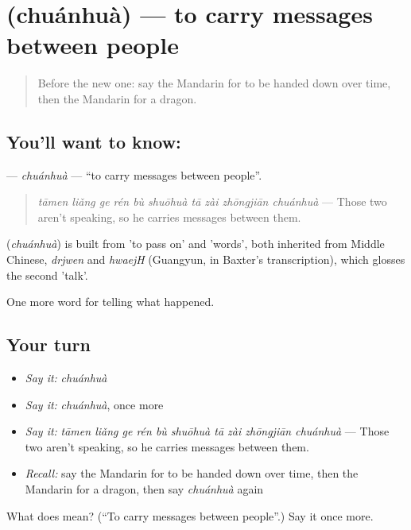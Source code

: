 \section[\texorpdfstring{\zh{传话} (chuánhuà)}{传话 (chuánhuà)}]{ (chuánhuà) — to carry messages between people}

\label{lesson:ZH-C328-chuanhua}



\begin{quote}
Before the new one: say the Mandarin for to be handed down over time, then the Mandarin for a dragon.
\end{quote}

\subsection*{You'll want to know: }
\textbf{} — \emph{chuánhuà} — \textquotedblleft{}to carry messages between people\textquotedblright{}.

\begin{quote}
\textbf{} \emph{tāmen liǎng ge rén bù shuōhuà tā zài zhōngjiān chuánhuà} — Those two aren't speaking, so he carries messages between them.
\end{quote}

\begin{cousinweb}
\textbf{} (\emph{chuánhuà}) is built from  'to pass on' and  'words', both inherited from Middle Chinese, \emph{drjwen} and \emph{hwaejH} (Guangyun, in Baxter's transcription), which glosses the second 'talk'.
\end{cousinweb}

\begin{grammarlens}[title={What you've built}]
One more word for telling what happened.
\end{grammarlens}

\subsection*{Your turn}
\begin{itemize}
\raggedright
  \item \emph{Say it:} \emph{chuánhuà}
  \item \emph{Say it:} \emph{chuánhuà}, once more
  \item \emph{Say it:} \emph{tāmen liǎng ge rén bù shuōhuà tā zài zhōngjiān chuánhuà} — Those two aren't speaking, so he carries messages between them.
  \item \emph{Recall:} say the Mandarin for to be handed down over time, then the Mandarin for a dragon, then say \emph{chuánhuà} again
\end{itemize}

\begin{tcolorbox}[breakable,colback=teal!4,colframe=teal!35!black,title={Before you move on}]
What does  mean? (\textquotedblleft{}To carry messages between people\textquotedblright{}.) Say it once more.
\end{tcolorbox}
